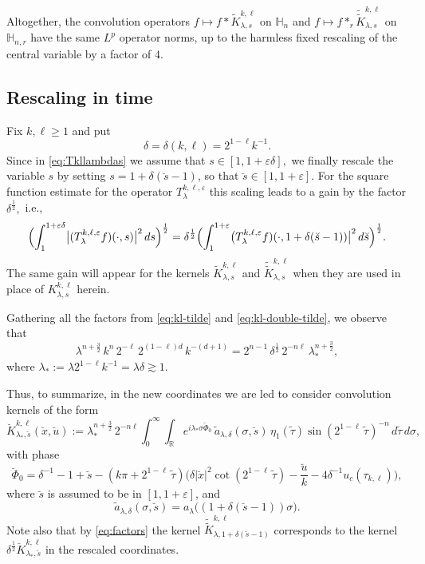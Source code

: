 \documentclass[leqno]{amsart}
\theoremstyle{definition}
\theoremstyle{remark}
\numberwithin{equation}{section}
\newcommand{\R}{\mathbb{R}}
\newcommand\la{{\lambda}}
\newcommand\ve{{\varepsilon}}
\newcommand\de{{\delta}}
\begin{document}
Altogether, the convolution operators $f\mapsto f * \tilde K_{\lambda,s}^{k,\ell}$ on $\mathbb H_n$  and $f\mapsto f *_r \tilde{\tilde K}_{\lambda,s}^{k,\ell}$ on $\mathbb H_{n,r}$ have the same $L^p$ operator norms, up to the harmless fixed rescaling of the central variable by a factor of $4$.


\subsection{Rescaling in time} Fix $k,\ell\ge 1$ and put
\[
\delta=\delta(k,\ell)=2^{1-\ell}k^{-1}.
\]
Since in \eqref{eq:Tkllambdas} we assume that $s\in [1,1+\ve\delta],$ we finally  rescale the  variable $s$  by setting $s = 1+\delta(\breve s-1)$, so that $\breve s\in[1,1+\varepsilon]$.
For the square function estimate for the operator $T^{k,\ell,\ve}_{\la} $ this scaling leads to a gain by the factor $\delta^{\frac 12},$ i.e., 
\begin{equation}\label{snorm}
\Bigl(\int_{1}^{1+\varepsilon\delta}\bigl|(T^{k,\ell,\ve}_{\la} f)(\cdot,s)\bigr|^2\,ds\Bigr)^{\frac12}
=
\delta^{\frac12}\Bigl(\int_{1}^{1+\varepsilon}\bigl (T^{k,\ell,\ve}_{\la} f)(\cdot,1+\delta(\breve s-1))\big|^2\,d\breve s\Bigr)^{\frac12}.
\end{equation}
The same gain will appear for the kernels $\tilde K_{\lambda,s}^{k,\ell}$ and $\tilde{\tilde K}_{\lambda, s}^{k,\ell}$ when they are used in place of $K_{\lambda, s}^{k,\ell}$ herein.

Gathering all the factors from \eqref{eq:kl-tilde} and \eqref{eq:kl-double-tilde}, we observe that
\begin{equation}\label{eq:factors}
\lambda^{n + \frac 32} \, k^{n} \, 2^{-\ell} \, 2^{(1-\ell)d} \, k^{-(d+1)} = 2^{n-1} \,\delta^{\frac{1}{2}} \, 2^{-n\ell}\,\lambda_*^{n + \frac 32},
\end{equation}
where $\lambda_* := \lambda 2^{1-\ell}k^{-1}=\lambda \delta\gtrsim 1$.

Thus, to summarize, in the new coordinates we are led to consider convolution kernels of the form
\begin{equation}\label{eq:kernel-breve}
\breve K_{\lambda_*,\breve s}^{k,\ell}(\breve x,\breve u) := \lambda_*^{n + \frac 32}\, 2^{-n\ell} \int_0^\infty \int_\R e^{i \lambda_* \sigma \breve \Phi_0} \,\tilde a_{\la,\de}(\sigma,\breve s) \, \eta_1(\tilde \tau)   \sin (2^{1-\ell} \, \tilde \tau)^{-n} \, d \tilde \tau \, d\sigma,
\end{equation}
with phase
\[
\breve \Phi_0= \delta^{-1}-1+\breve s -\left(k\pi + 2^{1-\ell} \, \tilde \tau\right)\Big(\delta |\breve x|^2 \cot( 2^{1-\ell} \, \tilde \tau) -  
\frac {\breve u}{k} -4\delta^{-1} u_c(\tau_{k,\ell})\Big),
\]
where  $\breve s$ is assumed to be in $[1,1+\ve]$, and
\begin{equation}\label{atilde}
\tilde a_{\la,\de}(\sigma,\breve s)=a_{\lambda}\big((1+\delta(\breve s-1))\sigma\big).
\end{equation}
Note also that  by \eqref{eq:factors} the kernel $ \tilde{\tilde K}_{\lambda,1+\delta(\breve s-1)}^{k,\ell} $ corresponds to the kernel $ \delta^{\frac 12} \breve K_{\lambda_*,\breve s}^{k,\ell}$ in the rescaled coordinates.
\end{document}
